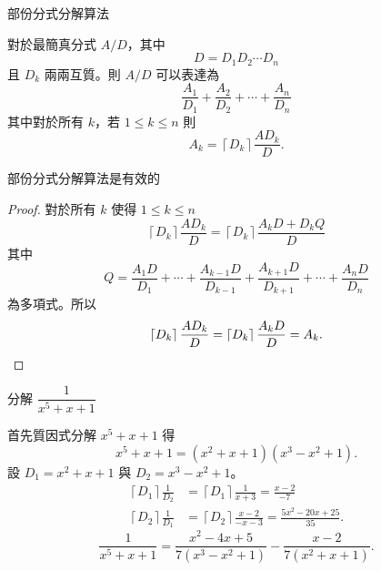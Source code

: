\documentclass{beamer}
\theoremstyle{remark}
\begin{document}
\begin{CJK}{UTF8}{bsmi}
\begin{frame}{部份分式分解算法}
  \begin{theorem}
    對於最簡真分式 $A/D$，其中
    \[D = D_1 D_2 \cdots D_n\]
    且 $D_k$ 兩兩互質。則 $A/D$ 可以表達為
    \[\frac{A_1}{D_1} + \frac{A_2}{D_2} + \cdots + \frac{A_n}{D_n}\]
    其中對於所有 $k$，若 $1 \le k \le n$ 則
    \[A_k = \left\lceil D_k \right\rceil \frac{AD_k}{D}.\]
  \end{theorem}
\end{frame}

\begin{frame}{部份分式分解算法是有效的}
  \begin{proof}
    對於所有 $k$ 使得 $1 \le k \le n$
    \[\left\lceil D_k \right\rceil \frac{AD_k}{D} = \left\lceil D_k \right\rceil \frac{A_k D + D_k Q}{D}\]
    其中
    \[Q = \frac{A_1 D}{D_1} + \cdots + \frac{A_{k-1}D}{D_{k-1}} + \frac{A_{k+1}D}{D_{k+1}} + \cdots + \frac{A_n D}{D_n}\]
    為多項式。所以
    \[\left\lceil D_k \right\rceil \frac{AD_k}{D} = \left\lceil D_k \right\rceil \frac{A_k D}{D} = A_k.\qedhere\]
  \end{proof}
\end{frame}

\begin{frame}{分解 $\dfrac{1}{x^5 + x + 1}$}
  \begin{solution}
    首先質因式分解 $x^5 + x + 1$ 得
    \[x^5 + x + 1 = \left( x^2 + x + 1 \right) \left( x^3 - x^2 + 1 \right).\]
    設 $D_1 = x^2 + x + 1$ 與 $D_2 = x^3 - x^2 + 1$。
    \begin{align*}
      \left\lceil D_1 \right\rceil \frac{1}{D_2} &= \left\lceil D_1 \right\rceil \frac{1}{x + 3} = \frac{x-2}{-7}\\
      \left\lceil D_2 \right\rceil \frac{1}{D_1} &= \left\lceil D_2 \right\rceil \frac{x - 2}{-x - 3}
	= \frac{5x^2 - 20x + 25}{35}.
    \end{align*}
    \[\frac{1}{x^5 + x + 1} = \frac{x^2 - 4x + 5}{7 \left( x^3 - x^2 + 1 \right)} 
      - \frac{x - 2}{7 \left( x^2 + x + 1 \right)}.\]
  \end{solution}
\end{frame}


\end{CJK}
\end{document}
